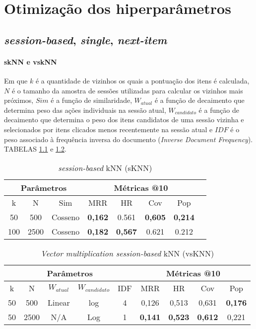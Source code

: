 \chapter{Otimização dos hiperparâmetros}

\section{\textit{session-based}, \textit{single}, \textit{next-item}}
\subsubsection{skNN e vskNN}
Em que $k$ é a quantidade de vizinhos os quais a pontuação dos itens é
calculada, $N$ é o tamanho da amostra de sessões utilizadas para calcular os
vizinhos mais próximos, $Sim$ é a função de similaridade, $W_{atual}$ é a função
de decaimento que determina peso das ações individuais na sessão atual,
$W_{candidato}$ é a função de decaimento que determina o peso dos itens
candidatos de uma sessão vizinha e selecionados por itens clicados menos
recentemente na sessão atual e $IDF$ é o peso associado à frequência inversa do
documento (\textit{Inverse Document Frequency}). TABELAS \ref{app:sknn} e
\ref{app:vsknn}.
\begin{table}[htbp]
  \centering
  \begin{tabular}{|c|c|c|c|c|c|c|c|}
    \hline
    \multicolumn{3}{|c|}{Parâmetros} & \multicolumn{4}{c|}{Métricas @10} \\
    \hline
    k & N & Sim & MRR & HR & Cov & Pop\\
    \hline
    50 & 500 & Cosseno & \textbf{0,162} & 0.561 & \textbf{0,605} & \textbf{0,214} \\
    \hline
    100 & 2500 & Cosseno & \textbf{0,182} & \textbf{0,567} & 0.621 & 0.212 \\
    \hline
  \end{tabular}
  \label{app:sknn}
  \caption{\textit{session-based} kNN (sKNN)}
\end{table}

\begin{table}[htbp]
  \centering
    \begin{tabular}{|c|c|c|c|c|c|c|c|c|}
      \hline
      \multicolumn{5}{|c|}{Parâmetros} & \multicolumn{4}{c|}{Métricas @10} \\
      \hline
      k & N & $W_{atual}$ & $W_{candidato}$ & IDF & MRR & HR & Cov & Pop \\
      \hline
      50 & 500 & Linear & log & 4 & 0,126 & 0,513  & 0,631 & \textbf{0,176} \\
      \hline
      50 & 2500 & N/A & Log & 1 & \textbf{0,141} & \textbf{0,523} & \textbf{0,612} & 0,221 \\
      \hline
    \end{tabular}
    \label{app:vsknn}
    \caption{\textit{Vector multiplication session-based} kNN (vsKNN)}
  \end{table}

